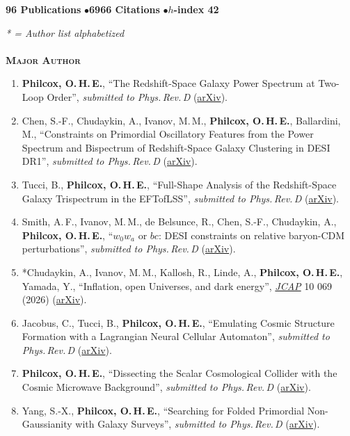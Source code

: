 \textbf{96 Publications} \quad$\bullet$\quad \textbf{6966 Citations} \quad$\bullet$\quad \textbf{$h$-index 42} 

\textit{* = Author list alphabetized}\\\\
\textbf{\textsc{Major Author}}
\begin{enumerate}
    \item \textbf{Philcox, O.\,H.\,E.}, ``The Redshift-Space Galaxy Power Spectrum at Two-Loop Order'', \textit{submitted to Phys.\,Rev.\,D} (\href{https://arxiv.org/abs/2610.13867}{arXiv}).
    \item Chen, S.-F., Chudaykin, A., Ivanov, M.\,M., \textbf{Philcox, O.\,H.\,E.}, Ballardini, M., ``Constraints on Primordial Oscillatory Features from the Power Spectrum and Bispectrum of Redshift-Space Galaxy Clustering in DESI DR1'', \textit{submitted to Phys.\,Rev.\,D} (\href{https://arxiv.org/abs/2610.10530}{arXiv}).
    \item Tucci, B., \textbf{Philcox, O.\,H.\,E.}, ``Full-Shape Analysis of the Redshift-Space Galaxy Trispectrum in the EFTofLSS'', \textit{submitted to Phys.\,Rev.\,D} (\href{https://arxiv.org/abs/2610.08908}{arXiv}).
    \item Smith, A.\,F., Ivanov, M.\,M., de Belsunce, R., Chen, S.-F., Chudaykin, A., \textbf{Philcox, O.\,H.\,E.}, ``$w_0w_a$ or $bc$: DESI constraints on relative baryon-CDM perturbations'', \textit{submitted to Phys.\,Rev.\,D} (\href{https://arxiv.org/abs/2609.10794}{arXiv}).
    \item *Chudaykin, A., Ivanov, M.\,M., Kallosh, R., Linde, A., \textbf{Philcox, O.\,H.\,E.}, Yamada, Y., ``Inflation, open Universes, and dark energy'', \href{https://doi.org/10.1088/1475-7516/2026/10/069}{\textit{JCAP}} 10 069 (2026) (\href{https://arxiv.org/abs/2607.28445}{arXiv}).
    \item Jacobus, C., Tucci, B., \textbf{Philcox, O.\,H.\,E.}, ``Emulating Cosmic Structure Formation with a Lagrangian Neural Cellular Automaton'', \textit{submitted to Phys.\,Rev.\,D} (\href{https://arxiv.org/abs/2607.27320}{arXiv}).
    \item \textbf{Philcox, O.\,H.\,E.}, ``Dissecting the Scalar Cosmological Collider with the Cosmic Microwave Background'', \textit{submitted to Phys.\,Rev.\,D} (\href{https://arxiv.org/abs/2607.18369}{arXiv}).
    \item Yang, S.-X., \textbf{Philcox, O.\,H.\,E.}, ``Searching for Folded Primordial Non-Gaussianity with Galaxy Surveys'', \textit{submitted to Phys.\,Rev.\,D} (\href{https://arxiv.org/abs/2607.15337}{arXiv}).

\end{enumerate}
